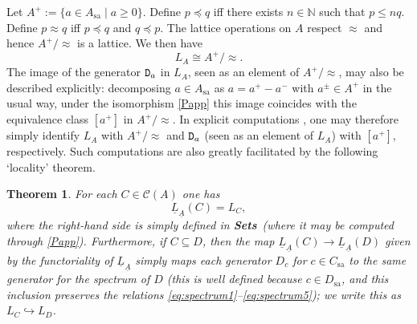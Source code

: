 \documentclass[12pt]{article}
\newcommand{\beq}{\begin{equation}}
\newcommand{\eeq}{\end{equation}}
\newcommand{\Sets}{\mbox{\textbf{Sets}}}
\newcommand{\raw}{\rightarrow} \newcommand{\rat}{\mapsto}
\newcommand{\er}{\eqref}
\newcommand{\CA}{{\mathcal A}} \newcommand{\CB}{{\mathcal B}}
\newcommand{\alg}[1]{\ensuremath{#1}}
\newcommand{\context}{\ensuremath{\mathcal{C}}}
\newcommand{\sa}{\ensuremath{_{\mathrm{sa}}}}
\newcommand{\prop}[1]{\ensuremath{\mbox{\texttt{#1}}}}
\newcommand{\uA}{\underline{A}}
\renewcommand{\CA}{\mathcal{C}(A)}
\renewcommand{\CA}{\context(\alg{A})}
\newtheorem{theorem}{Theorem}
\begin{document}
Let $A^+:=\{a \in A\sa \mid a \geq 0\}$. Define $p \preccurlyeq
q$ iff there exists $n\in\mathbb{N}$ such that $p\leqslant
n q$. Define $p \approx q$ iff $p\preccurlyeq q$ and $q\preccurlyeq p$. The
lattice operations on $A$ respect $\approx$ and hence $A^+/\approx$ is a lattice.
We then have
\beq 
L_A \cong A^+/\approx. \label{Papp}
\eeq
The image of the generator  $\prop{D}_a$ in $L_A$, seen as an element of $A^+/\approx$, may also be described explicitly:
 decomposing $a\in A\sa$ as $a=a^+-a^-$ with $a^{\pm}\in A^+$ in the usual way, under the isomorphism \er{Papp} this image coincides with the equivalence class $[a^+]$ in $A^+/\approx$.
In explicit computations \cite{HLSFP,HLSSyn}, one may  therefore simply  identify $L_A$ with $A^+/\approx$ and $\prop{D}_a$ (seen as an element of $L_A$) with $[a^+]$, respectively. Such computations are also greatly facilitated by the following `locality' theorem.
\begin{theorem}\label{thm:internalspectrum}
For each $C\in\CA$ one has
 \beq \underline{L}_{\uA}(C)=L_C, \label{Llocal}\eeq
 where the right-hand side is simply defined in \Sets\ (where it may be computed through \er{Papp}). 
 Furthermore,  if $C\subseteq D$, then the map $\underline{L}_{\uA}(C)\raw \underline{L}_{\uA}(D)$  given by the functoriality of $\underline{L}_{\uA}$
simply maps each generator $D_c$ for $c\in C\sa$  to the same generator
for the spectrum of $D$ (this is well defined because $c\in D\sa$,
and this inclusion  preserves the relations
\er{eq:spectrum1}--\er{eq:spectrum5}); we write this as $L_C\hookrightarrow L_D$.
\end{theorem}
\end{document}
